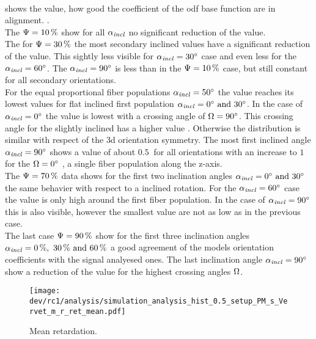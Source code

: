 \paragraph{\acc{}}
 shows the \acc{} value, \ie{} how good the coefficient of the odf base function are in alignment.
\dummy[acc of psi = 1]{}.
\\
% 
The $\textnormal{$\Psi$}=\SI{10}{\percent}$ show for all $\textnormal{$\alpha_{\mathit{incl}}$}$ no significant reduction of the \acc{} value.
\\
% 
The for $\textnormal{$\Psi$}=\SI{30}{\percent}$ the most secondary inclined values have a significant reduction of the \acc{} value.
This sightly less visible for $\textnormal{$\alpha_{\mathit{incl}}$} = \SI{30}{\degree}$ case and even less for the $\textnormal{$\alpha_{\mathit{incl}}$} = \SI{60}{\degree}$.
The $\textnormal{$\alpha_{\mathit{incl}}$} = \SI{90}{\degree}$ is less than in the $\textnormal{$\Psi$}=\SI{10}{\percent}$ case, but still constant for all secondary orientations.
\\
% 
For the equal proportional fiber populations $\textnormal{$\alpha_{\mathit{incl}}$} = \SI{50}{\degree}$ the \acc{} value reaches its lowest values for flat inclined first population $\modelInc = \SIlist{0;30}{\degree}$.
In the case of $\textnormal{$\alpha_{\mathit{incl}}$} = \SI{0}{\degree}$ the \acc{} value is lowest with a crossing angle of $\textnormal{$\Omega$} = \SI{90}{\degree}$.
This crossing angle for the slightly inclined has a higher \acc{} value .
Otherwise the distribution is similar with respect of the 3d orientation symmetry.
The most first inclined angle $\textnormal{$\alpha_{\mathit{incl}}$}=\SI{90}{\degree}$ shows a \acc{} value of about $\SI{0.5}{}$ for all orientations with an increase to $\SI{1}{}$ for the $\textnormal{$\Omega$} = \SI{0}{\degree}$ ,\ie{} a single fiber population along the z-axis.
\\
% 
The $\textnormal{$\Psi$}=\SI{70}{\percent}$ data shows for the first two inclination angles $\modelInc = \SIlist{0;30}{\degree}$ the same behavier with respect to a inclined rotation.
For the $\textnormal{$\alpha_{\mathit{incl}}$}=\SI{60}{\degree}$ case the \acc{} value is only high around the first fiber population.
In the case of $\textnormal{$\alpha_{\mathit{incl}}$}=\SI{90}{\degree}$ this is also visible, however the smallest value are not as low as in the previous case.
\\
% 
The last case $\textnormal{$\Psi$}=\SI{90}{\percent}$ show for the first three inclination angles $\modelInc=\SIlist{0;30;60}{\percent}$ a good agreement of the models orientation coefficients with the signal analyesed ones.
The last inclination angle $\textnormal{$\alpha_{\mathit{incl}}$}=\SI{90}{\degree}$ show a reduction of the \acc{} value for the highest crossing angles $\textnormal{$\Omega$}$.
% 
% 
% 
\begin{figure}[!p]
\centering
\texttt{[image: dev/rc1/analysis/simulation\_analysis\_hist\_0.5\_setup\_PM\_s\_Vervet\_m\_r\_ret\_mean.pdf]}
\caption[Simulation retardation]{Mean retardation.}
\label{fig:sim_ana_ret}
\end{figure}
% 

